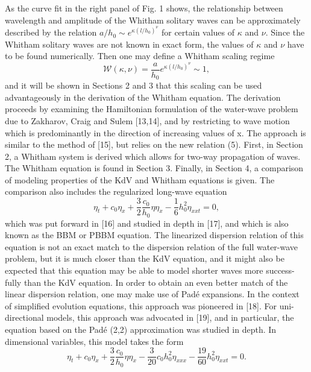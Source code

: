As the curve fit in the right panel of Fig. 1 shows, the relationship
between wavelength and amplitude of the Whitham solitary
waves can be approximately described by the relation $a/h_0 \sim e^{\kappa(l/h_0)^{\nu}}$ for certain values of $\kappa$ and $\nu$. Since the Whitham solitary
waves are not known in exact form, the values of $\kappa$ and $\nu$ have to be
found numerically. Then one may define a Whitham scaling regime
\begin{equation}
\mathcal{W}(\kappa, \nu) = \frac{a}{h_0}e^{\kappa(l/h_0)^{\nu}} \sim 1,
\label{whitham-regime}
\end{equation}
and it will be shown in Sections 2 and 3 that this scaling can be used
advantageously in the derivation of the Whitham equation. The
derivation proceeds by examining the Hamiltonian formulation of
the water-wave problem due to Zakharov, Craig and Sulem [13,14],
and by restricting to wave motion which is predominantly in the
direction of increasing values of x. The approach is similar to the
method of [15], but relies on the new relation (5).
First, in Section 2, a Whitham system is derived which allows for
two-way propagation of waves. The Whitham equation is found in
Section 3. Finally, in Section 4, a comparison of modeling properties
of the KdV and Whitham equations is given. The comparison also
includes the regularized long-wave equation
\begin{equation}
\eta_t + c_0 \eta_x + \frac{3}{2} \frac{c_0}{h_0} \eta \eta_x - \frac{1}{6} h_0^2 \eta_{xxt} = 0,
\label{regularized-long-wave}
\end{equation}
which was put forward in [16] and studied in depth in [17], and
which is also known as the BBM or PBBM equation. The linearized
dispersion relation of this equation is not an exact match to the
dispersion relation of the full water-wave problem, but it is much
closer than the KdV equation, and it might also be expected that
this equation may be able to model shorter waves more success-
fully than the KdV equation. In order to obtain an even better match
of the linear dispersion relation, one may make use of Pad\'e  expansions. In the context of simplified evolution equations, this
approach was pioneered in [18]. For uni-directional models, this
approach was advocated in [19], and in particular, the equation
based on the Pad\'e (2,2) approximation was studied in depth. In dimensional variables, this model takes the form
\begin{equation}
\eta_t + c_0 \eta_x + \frac{3}{2} \frac{c_0}{h_0} \eta \eta_x
- \frac{3}{20} c_0 h_0^2 \eta_{xxx} - \frac{19}{60} h_0^2 \eta_{xxt} = 0.
\label{pade-2-2}
\end{equation}
